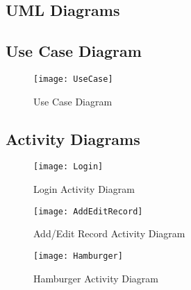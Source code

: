 \documentclass[
10pt, %
a4paper, %
oneside, %
headinclude,footinclude, %
BCOR5mm, %
]{scrartcl}
\begin{document}
\begin{appendices}


\newpage

\section{UML Diagrams} %
\label{sec:uml}

\subsection{Use Case Diagram}
\label{sub:use_case_diagram}

\begin{figure}[htb]
\centering 
\texttt{[image: UseCase]} 
\caption{Use Case Diagram} 
\label{fig:use_case_diagram} 
\end{figure}

\newpage

\subsection{Activity Diagrams}
\label{sec:activity_diagram}

\begin{figure}[htb]
\centering 
\texttt{[image: Login]} 
\caption{Login Activity Diagram} 
\label{fig:login} 
\end{figure}

\begin{figure}[htb]
\centering 
\texttt{[image: AddEditRecord]} 
\caption{Add/Edit Record Activity Diagram}
\label{fig:add_edit_record} 
\end{figure}

\begin{figure}[htb]
\centering 
\texttt{[image: Hamburger]} 
\caption{Hamburger Activity Diagram} 
\label{fig:hamburger} 
\end{figure}

\end{appendices}
\end{document}
